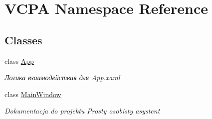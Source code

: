 \hypertarget{namespace_v_c_p_a}{}\section{V\+C\+PA Namespace Reference}
\label{namespace_v_c_p_a}
\subsection*{Classes}
\begin{DoxyCompactItemize}
\item 
class \mbox{\hyperlink{class_v_c_p_a_1_1_app}{App}}
\begin{DoxyCompactList}\small\item\em Логика взаимодействия для App.\+xaml \end{DoxyCompactList}\item 
class \mbox{\hyperlink{class_v_c_p_a_1_1_main_window}{Main\+Window}}
\begin{DoxyCompactList}\small\item\em Dokumentacja do projektu Prosty osobisty asystent \end{DoxyCompactList}\end{DoxyCompactItemize}
